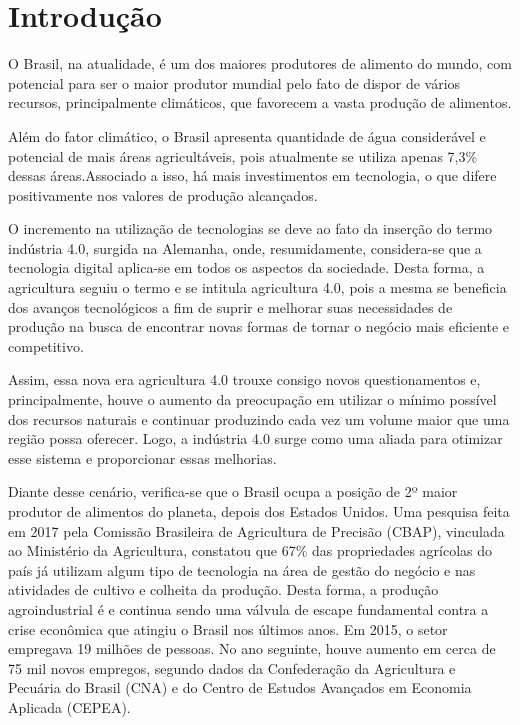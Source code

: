 \documentclass[eso]{bcc}
\begin{document}
\renewcommand\contentsname{\centerline{Sumário}}
\renewcommand\listfigurename{\centerline{Lista de Figuras}}

\tableofcontents

\listoffigures
{}


\inicio\chapter{Introdução}

O Brasil, na atualidade, é um dos maiores produtores de alimento do mundo, com potencial para 
ser o maior produtor mundial pelo fato de dispor de vários recursos, principalmente climáticos, 
que favorecem a vasta produção de alimentos.

Além do fator climático, o Brasil apresenta quantidade de água considerável e potencial de 
mais áreas agricultáveis, pois atualmente se utiliza apenas 7,3\% dessas áreas.Associado a isso, 
há mais investimentos em tecnologia, o que difere positivamente nos valores de produção alcançados.

O incremento na utilização de tecnologias se deve ao fato da inserção do termo indústria 4.0, 
surgida na Alemanha, onde, resumidamente, considera-se que a tecnologia digital aplica-se em todos 
os aspectos da sociedade. Desta forma, a agricultura seguiu o termo e se intitula agricultura 4.0, 
pois a mesma se beneficia dos avanços tecnológicos a fim de suprir e melhorar suas necessidades 
de produção na busca de encontrar novas formas de tornar o negócio mais eficiente e competitivo.

Assim, essa nova era agricultura 4.0 trouxe consigo novos questionamentos e, principalmente, 
houve o aumento da preocupação em utilizar o mínimo possível dos recursos naturais e continuar 
produzindo cada vez um volume maior que uma região possa oferecer. Logo, a indústria 4.0 surge 
como uma aliada para otimizar esse sistema e proporcionar essas melhorias.

Diante desse cenário, verifica-se que o Brasil ocupa a posição de 2º maior produtor de alimentos 
do planeta, depois dos Estados Unidos. Uma pesquisa feita em 2017 pela Comissão Brasileira de 
Agricultura de Precisão (CBAP), vinculada ao Ministério da Agricultura, constatou que 67\% das 
propriedades agrícolas do país já utilizam algum tipo de tecnologia na área de gestão do negócio 
e nas atividades de cultivo e colheita da produção. Desta forma, a produção agroindustrial é 
e continua sendo uma válvula de escape fundamental contra a crise econômica que atingiu o Brasil 
nos últimos anos. Em 2015, o setor empregava 19 milhões de pessoas. No ano seguinte, houve aumento 
em cerca de 75 mil novos empregos, segundo dados da Confederação da Agricultura e Pecuária do Brasil 
(CNA) e do Centro de Estudos Avançados em Economia Aplicada (CEPEA).
\end{document}
